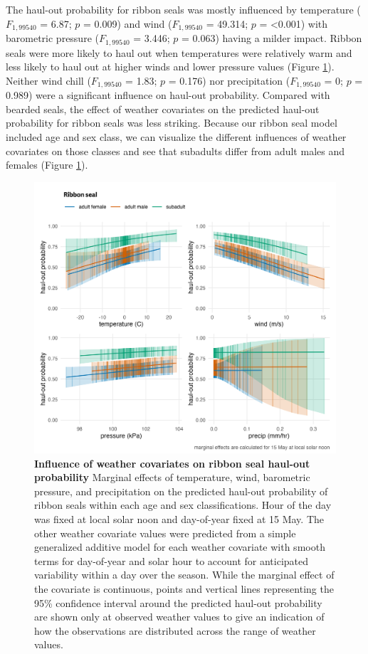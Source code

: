 \documentclass[fleqn,10pt,lineno]{wlpeerj} %
\begin{document}
The haul-out probability for ribbon seals was mostly influenced by
temperature
(\(F_{1,99540}\)
= 6.87; \(p\) = 0.009) and wind
(\(F_{1,99540}\)
= 49.314; \(p\) = \textless0.001) with barometric pressure
(\(F_{1,99540}\)
= 3.446; \(p\) =
0.063) having a milder impact.
Ribbon seals were more likely to haul out when temperatures were
relatively warm and less likely to haul out at higher winds and lower pressure
values (Figure \ref{fig:ribbonHOwx}). Neither wind chill
(\(F_{1,99540}\)
= 1.83; \(p\) =
0.176) nor precipitation
(\(F_{1,99540}\)
= 0; \(p\) =
0.989) were a significant
influence on haul-out probability. Compared with bearded seals, the effect of
weather covariates on the predicted haul-out probability for
ribbon seals was less striking. Because our ribbon seal model included age and sex class, we can
visualize the different influences of weather covariates on those classes and see
that subadults differ from adult males and females (Figure \ref{fig:ribbonHOwx}).



\begin{figure}
\includegraphics[width=1\linewidth]{../figures/Figure-008} \caption{\textbf{Influence of weather covariates on ribbon seal haul-out probability} \linebreak Marginal effects of temperature, wind, barometric pressure, and precipitation on the predicted haul-out probability of ribbon seals within each age and sex classifications. Hour of the day was fixed at local solar noon and day-of-year fixed at 15 May. The other weather covariate values were predicted from a simple generalized additive model for each weather covariate with smooth terms for day-of-year and solar hour to account for anticipated variability within a day over the season. While the marginal effect of the covariate is continuous, points and vertical lines representing the 95\% confidence interval around the predicted haul-out probability are shown only at observed weather values to give an indication of how the observations are distributed across the range of weather values.}\label{fig:ribbonHOwx}
\end{figure}
\end{document}
